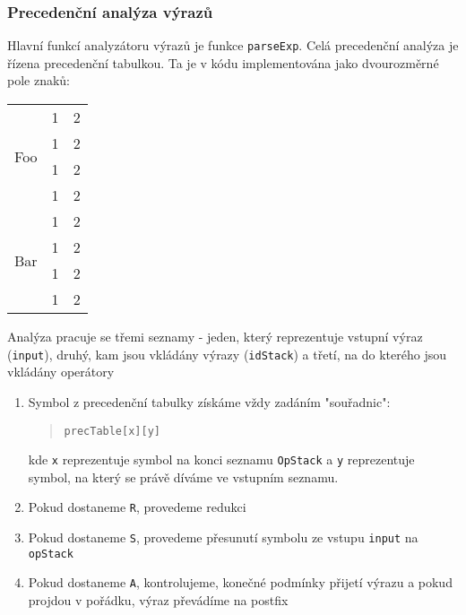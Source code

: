 \documentclass[czech,a4paper,12pt]{article}[]
\begin{document}
\begin{inpar}
    \subsubsection{Precedenční analýza výrazů}
        \begin{inpar}
            Hlavní funkcí analyzátoru výrazů je funkce \texttt{parseExp}. Celá precedenční analýza je řízena precedenční tabulkou. Ta je v kódu implementována jako dvourozměrné pole znaků:
            \begin{center}
                \begin{tabular}{|c|cc|}\hline
                    \multirow{4}{*}{Foo} & 1 & 2 \\
                        & 1 & 2 \\\cline{2-3}
                        & 1 & 2 \\
                        & 1 & 2 \\\hline
                    \multirow{4}{*}{Bar} & 1 & 2 \\
                        & 1 & 2 \\\cline{2-3}
                        & 1 & 2 \\
                        & 1 & 2 \\\hline
                    \end{tabular}
            \end{center}
           Analýza pracuje se třemi seznamy - jeden, který reprezentuje vstupní výraz (\texttt{input}), druhý, kam jsou vkládány výrazy (\texttt{idStack}) a třetí, na do kterého jsou vkládány operátory
            \begin{enumerate}
                \item Symbol z precedenční tabulky získáme vždy zadáním "souřadnic":
                \begin{quote}
                    \texttt{precTable[x][y]}
                \end{quote}
                kde \texttt{x} reprezentuje symbol na konci seznamu \texttt{OpStack} a \texttt{y} reprezentuje symbol, na který se právě díváme ve vstupním seznamu.
                \item Pokud dostaneme \texttt{R}, provedeme redukci
                \item Pokud dostaneme \texttt{S}, provedeme přesunutí symbolu ze vstupu \texttt{input} na \texttt{opStack}
                \item Pokud dostaneme \texttt{A}, kontrolujeme, konečné podmínky přijetí výrazu a pokud projdou v pořádku, výraz převádíme na postfix

\end{enumerate}
\end{inpar}
\end{inpar}
\end{document}
